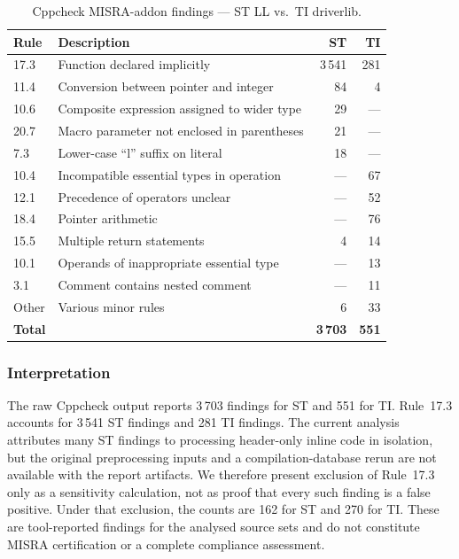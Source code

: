 \begin{table}[H]
\centering
\caption{Cppcheck MISRA-addon findings --- ST LL vs.\ TI driverlib.}
\label{tab:ti-misra}
\begin{tabular}{l l r r}
\toprule
\textbf{Rule} & \textbf{Description} & \textbf{ST} & \textbf{TI} \\
\midrule
17.3 & Function declared implicitly       & 3\,541 &  281 \\
11.4 & Conversion between pointer and integer & 84 &    4 \\
10.6 & Composite expression assigned to wider type & 29 & --- \\
20.7 & Macro parameter not enclosed in parentheses & 21 & --- \\
7.3  & Lower-case ``l'' suffix on literal  &    18 & --- \\
10.4 & Incompatible essential types in operation & --- & 67 \\
12.1 & Precedence of operators unclear     & --- &   52 \\
18.4 & Pointer arithmetic                  & --- &   76 \\
15.5 & Multiple return statements          &     4 &   14 \\
10.1 & Operands of inappropriate essential type & --- & 13 \\
3.1  & Comment contains nested comment     & --- &   11 \\
Other & Various minor rules                &    6 &   33 \\
\midrule
\textbf{Total} & & \textbf{3\,703} & \textbf{551} \\
\bottomrule
\end{tabular}
\end{table}

\subsubsection*{Interpretation}
The raw Cppcheck output reports 3\,703 findings for ST and 551 for TI. Rule~17.3 accounts
for 3\,541 ST findings and 281 TI findings. The current analysis attributes many ST
findings to processing header-only inline code in isolation, but the original preprocessing
inputs and a compilation-database rerun are not available with the report artifacts. We
therefore present exclusion of Rule~17.3 only as a sensitivity calculation, not as proof
that every such finding is a false positive. Under that exclusion, the counts are 162 for
ST and 270 for TI. These are tool-reported findings for the analysed source sets and do not
constitute MISRA certification or a complete compliance assessment.

